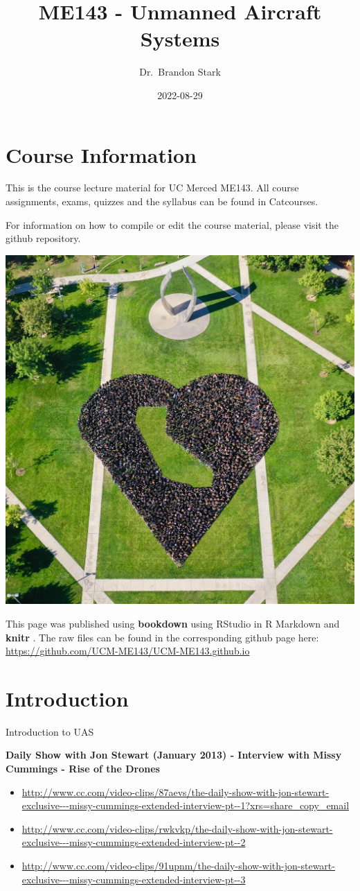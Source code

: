 \documentclass[
]{book}
\title{ME143 - Unmanned Aircraft Systems}
\author{Dr.~Brandon Stark}
\date{2022-08-29}
\providecommand{\tightlist}{%
  \setlength{\itemsep}{0pt}\setlength{\parskip}{0pt}}
\theoremstyle{definition}
\theoremstyle{definition}
\theoremstyle{definition}
\theoremstyle{definition}
\theoremstyle{remark}
\begin{document}
\maketitle

{
\setcounter{tocdepth}{1}
\tableofcontents
}
\hypertarget{course-information}{%
\chapter{Course Information}\label{course-information}}

This is the course lecture material for UC Merced ME143. All course assignments, exams, quizzes and the syllabus can be found in Catcourses.

For information on how to compile or edit the course material, please visit the github repository.

\begin{center}\includegraphics[width=0.5\linewidth]{images/general/UCM_heart} \end{center}

This page was published using \textbf{bookdown}\citep{R-bookdown} using RStudio in R Markdown and \textbf{knitr} \citep{xie2015}. The raw files can be found in the corresponding github page here: \url{https://github.com/UCM-ME143/UCM-ME143.github.io}

\hypertarget{ch-intro}{%
\chapter{Introduction}\label{ch-intro}}

Introduction to UAS

\textbf{Daily Show with Jon Stewart (January 2013) - Interview with Missy Cummings - Rise of the Drones}

\begin{itemize}
\tightlist
\item
  \url{http://www.cc.com/video-clips/87aevs/the-daily-show-with-jon-stewart-exclusive---missy-cummings-extended-interview-pt--1?xrs=share_copy_email}
\item
  \url{http://www.cc.com/video-clips/rwkvkp/the-daily-show-with-jon-stewart-exclusive---missy-cummings-extended-interview-pt--2}
\item
  \url{http://www.cc.com/video-clips/91upnm/the-daily-show-with-jon-stewart-exclusive---missy-cummings-extended-interview-pt--3}
\end{itemize}
\end{document}

